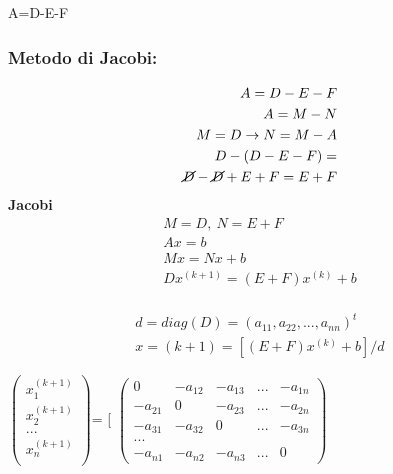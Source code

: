 \documentclass{article} %
\begin{document}
\begin{center}
    A=D-E-F

    \subsubsection*{Metodo di Jacobi:}
    \begin{align*}
        A=D-E-F\\
        A=M-N\\
        M=D \rightarrow N=M-A\\
        D-(D-E-F)=\\
        \cancel{D}-\cancel{D}+E+F=E+F\\
    \end{align*}
\newpage
    \textbf{Jacobi}\newline
    \begin{align*}
        M=D, \ N=E+F\\
        Ax=b\\
        Mx=Nx+b\\
        Dx^{(k+1)}=(E+F)x^{(k)}+b\\
    \end{align*}


    \begin{align*}
        d=diag(D)={(a_{11}, a_{22},...,a_{nn})}^t\\
        x={(k+1)}=[(E+F)x^{(k)}+b]/d
    \end{align*}

    \(\begin{pmatrix}
        x_{1}^{(k+1)}\\
        x_{2}^{(k+1)} \\
        ...\\
        x_{n}^{(k+1)} \\
    \end{pmatrix}\)=
    [
        \(\begin{pmatrix}
            0 & -a_{12} & -a_{13} & ... & -a_{1n}\\
            -a_{21} & 0 & -a_{23} & ... & -a_{2n}\\
            -a_{31} & -a_{32} & 0 & ... & -a_{3n}\\
            ...\\
            -a_{n1} & -a_{n2} & -a_{n3} & ... & 0
        \end{pmatrix}\)


\end{center}
\end{document}
